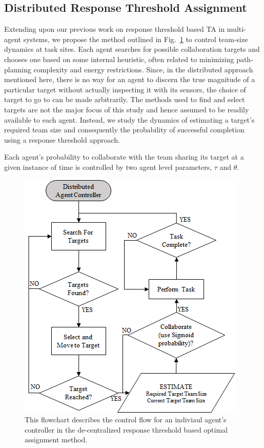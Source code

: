 \documentclass[11pt, onecolumn, compsoc, letterpaper]{article}
\begin{document}
\subsection{Distributed Response Threshold Assignment}
Extending upon our previous work on response threshold based TA in multi-agent systems, we propose the method outlined in Fig.~\ref{fig:distcontrol} to control team-size dynamics at task sites. Each agent searches for possible collaboration targets and chooses one based on some internal heuristic, often related to minimizing path-planning complexity and energy restrictions. Since, in the distributed approach mentioned here, there is no way for an agent to discern the true magnitude of a particular target without actually inspecting it with its sensors, the choice of target to go to can be made arbitrarily. The methods used to find and select targets are not the major focus of this study and hence assumed to be readily available to each agent. Instead, we study the dynamics of estimating a target's required team size and consequently the probability of successful completion using a response threshold approach.

Each agent's probability to collaborate with the team sharing its target at a given instance of time is controlled by two agent level parameters, $\tau$ and $\theta$.

\begin{figure}[!ht]
\centering\includegraphics[width=.65\columnwidth]{assets/DistributedController.png}
\centering\caption{This flowchart describes the control flow for an indiviaul agent's controller in the de-centralized response threshold based optimal assignment method.}\label{fig:distcontrol}
\end{figure}
\end{document}
